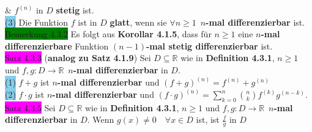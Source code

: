 \documentclass[landscape, 10pt]{article}
\newcommand{\R}{\mathbb{R}}
\begin{document}
\begin{multicols}{3}
                            \& \textcolor{NavyBlue}{$f^{(n)}$} 
                            in \textcolor{NavyBlue}{$D$} \textbf{stetig} ist.\\
                     \colorbox{SkyBlue}{(3)} Die Funktion \textcolor{NavyBlue}{$f$} 
                            ist in \textcolor{NavyBlue}{$D$} \textbf{glatt}, wenn sie 
                            \textcolor{NavyBlue}{$\forall n\geqslant1$}\,
                            \textbf{$n$-mal differenzierbar} ist.\\
              \colorbox{green}{Bemerkung 4.3.2} 
                     Es folgt aus \textbf{Korollar 4.1.5}, dass für 
                     \textcolor{NavyBlue}{$n\geqslant1$} eine 
                     \textbf{$n$-mal differenzierbare}
                     Funktion \textbf{$(n-1)$-mal 
                     stetig differenzierbar} ist.\\
              \colorbox{magenta}{Satz 4.3.3} 
              (\textbf{analog zu Satz 4.1.9}) 
                     Sei \textcolor{NavyBlue}{$D\subseteq\R$} wie in 
                     \textbf{Definition 4.3.1}, 
                     \textcolor{NavyBlue}{$n\geqslant1$} und 
                     \textcolor{NavyBlue}{$f,g:D\longrightarrow\R$}\,
                     \textbf{$n$-mal 
                     differenzierbar} in \textcolor{NavyBlue}{$D$}.\\
                     \colorbox{SkyBlue}{(1)} \textcolor{NavyBlue}{$f+g$} 
                            ist $n$\textbf{-mal differenzierbar} und 
                            \textcolor{NavyBlue}{$(f+g)^{(n)}=f^{(n)}+g^{(n)}$}\\
                     \colorbox{SkyBlue}{(2)} \textcolor{NavyBlue}{$f\cdot g$}
                            ist $n$\textbf{-mal differenzierbar} 
                            und \textcolor{NavyBlue}{
                            $(f\cdot g)^{(n)}
                            =\sum_{k=0}^n\binom{n}{k}f^{(k)}g^{(n-k)}$}.\\
              \colorbox{magenta}{Satz 4.3.5} 
                     Sei \textcolor{NavyBlue}{$D\subseteq\R$} wie in 
                     \textbf{Definition 4.3.1}, 
                     \textcolor{NavyBlue}{$n\geqslant1$} und 
                     \textcolor{NavyBlue}{$f,g:D\longrightarrow\R$}\,
                     \textbf{$n$-mal differenzierbar} in 
                     \textcolor{NavyBlue}{$D$}. Wenn 
                     \textcolor{NavyBlue}{$g(x)\neq0\quad\forall x\in D$} ist, 
                     ist \textcolor{NavyBlue}{$\frac{f}{g}$} 
                     in \textcolor{NavyBlue}{$D$} 

\end{multicols}
\end{document}
